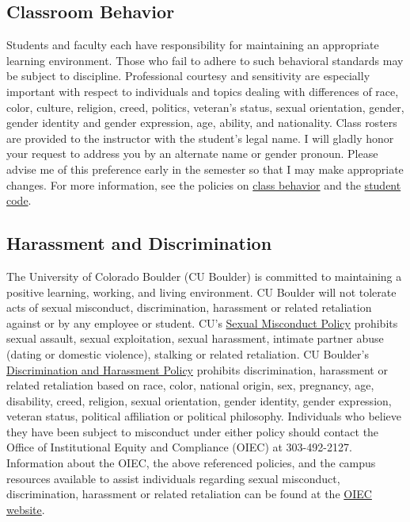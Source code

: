\documentclass[10pt]{memoir}
\begin{document}
\subsection{Classroom Behavior}
Students and faculty each have responsibility for maintaining an appropriate learning environment. Those who fail to adhere to such behavioral standards may be subject to discipline. Professional courtesy and sensitivity are especially important with respect to individuals and topics dealing with differences of race, color, culture, religion, creed, politics, veteran’s status, sexual orientation, gender, gender identity and gender expression, age, ability, and nationality.  Class rosters are provided to the instructor with the student's legal name. I will gladly honor your request to address you by an alternate name or gender pronoun. Please advise me of this preference early in the semester so that I may make appropriate changes. For more information, see the policies on \href{http://www.colorado.edu/policies/student-classroom-and-course-related-behavior}{class behavior} and the \href{http://www.colorado.edu/osc/#student_code}{student code}.

\subsection{Harassment and Discrimination}
The University of Colorado Boulder (CU Boulder) is committed to maintaining a positive learning, working, and living environment. CU Boulder will not tolerate acts of sexual misconduct, discrimination, harassment or related retaliation against or by any employee or student. CU's \href{http://www.colorado.edu/policies/discrimination-and-harassment-policy-and-procedures}{Sexual Misconduct Policy} prohibits sexual assault, sexual exploitation, sexual harassment, intimate partner abuse (dating or domestic violence), stalking or related retaliation. CU Boulder's \href{http://www.colorado.edu/policies/discrimination-and-harassment-policy-and-procedures}{Discrimination and Harassment Policy} prohibits discrimination, harassment or related retaliation based on race, color, national origin, sex, pregnancy, age, disability, creed, religion, sexual orientation, gender identity, gender expression, veteran status, political affiliation or political philosophy. Individuals who believe they have been subject to misconduct under either policy should contact the Office of Institutional Equity and Compliance (OIEC) at 303-492-2127. Information about the OIEC, the above referenced policies, and the campus resources available to assist individuals regarding sexual misconduct, discrimination, harassment or related retaliation can be found at the \href{http://www.colorado.edu/institutionalequity/}{OIEC website}.
\end{document}
